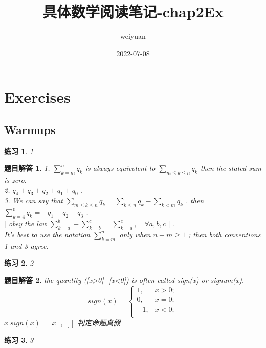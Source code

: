 \documentclass[mode=geye]{elegantnote}
\title{具体数学阅读笔记-chap2Ex}
\author{weiyuan}
\date{2022-07-08}
\newtheorem{exercise}{练习}
\newtheorem{answer}{题目解答}
\begin{document}
\maketitle
\section{Exercises}
\subsection{Warmups}
\begin{exercise}
1
\end{exercise}

\begin{answer}
    1. $ \sum_{k=m}^{n} q_k $ is always equivolent to $ \sum_{m \leqslant k \leqslant n} q_k $ then the stated sum is zero.\\
    2. $ q_4+q_3+q_2+q_1+q_0 $ .\\
    3. We can say that $ \sum_{m \leqslant k \leqslant n} q_k = \sum_{k \leqslant n} q_k  -\sum_{k<m} q_k $ . then $ \sum_{k=4}^{0}q_k = -q_1-q_2-q_3 $ .\\
    $ [ $ obey the law 
        $ \sum_{k=a}^{b}+
        \sum_{k=b}^{c}=
        \sum_{k=a}^{c}, 
        \quad \forall a, b, c $  $ ] $ .\\
    It's best to use the notation $ \sum_{k=m}^{n} $ only when $ n-m \geqslant 1 $ ; then both conventions 1 and 3 agree.
\end{answer}

\begin{exercise}
    2
\end{exercise}

\begin{answer}
    the quantity ([x>0]\_[x<0]) is often called sign(x) or signum(x).
    \begin{equation*}
        sign(x) = \left\{
            \begin{array}{ll}
                1,  & x>0; \\
                0,  & x=0; \\
                -1, & x<0; \\
            \end{array}
        \right.
    \end{equation*}
    $ x\; sign(x) = |x| $ , $ [] $ 判定命题真假
\end{answer}

\begin{exercise}
    3
\end{exercise}
\end{document}
